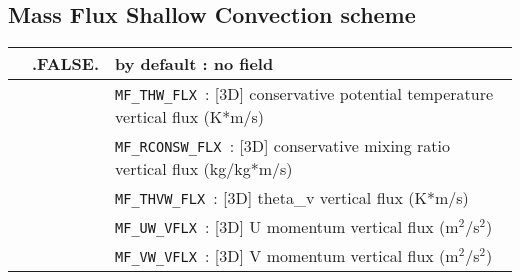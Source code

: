 \subsection{Mass Flux Shallow Convection scheme}
\begin{makeimage}
\begin{tabular}{|>{\centering}p{3cm}|>{\centering}p{2.5cm}|p{11cm}|}
 \hline
\multirow{6}{*}{LMFFLX}\index{LMFFLX!\innam{NAM\_DIAG}}&\textbf{.FALSE.} & by default : no field \\\cline{2-3}
 &\multirow{5}{*}{.TRUE.} & {\tt MF\_THW\_FLX }: [3D] conservative potential temperature vertical flux
 (K*m/s)\\\cline{3-3}
& &{\tt MF\_RCONSW\_FLX }: [3D] conservative mixing ratio vertical flux (kg/kg*m/s) \\\cline{3-3}
&&{\tt MF\_THVW\_FLX }: [3D] theta\_v vertical flux (K*m/s) \\ \cline{3-3}
& &{\tt MF\_UW\_VFLX }: [3D] U momentum vertical flux (m$^2$/s$^2$) \\ \cline{3-3}
& &{\tt MF\_VW\_VFLX }: [3D] V momentum vertical flux (m$^2$/s$^2$) \\ \hline
\end{tabular} 
\end{makeimage}




